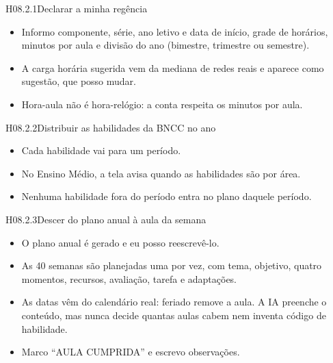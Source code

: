 \begin{historia}{H08.2.1}{Declarar a minha regência}{\pronto}
\aceite
\begin{itemize}
  \item Informo componente, série, ano letivo e data de início, grade de
    horários, minutos por aula e divisão do ano (bimestre, trimestre ou
    semestre).
  \item A carga horária sugerida vem da mediana de redes reais e aparece como
    sugestão, que posso mudar.
  \item Hora-aula não é hora-relógio: a conta respeita os minutos por aula.
\end{itemize}
\end{historia}

\begin{historia}{H08.2.2}{Distribuir as habilidades da BNCC no ano}{\pronto}
\aceite
\begin{itemize}
  \item Cada habilidade vai para um período.
  \item No Ensino Médio, a tela avisa quando as habilidades são por área.
  \item Nenhuma habilidade fora do período entra no plano daquele período.
\end{itemize}
\end{historia}

\begin{historia}{H08.2.3}{Descer do plano anual à aula da semana}{\pronto}
\aceite
\begin{itemize}
  \item O plano anual é gerado e eu posso reescrevê-lo.
  \item As 40 semanas são planejadas uma por vez, com tema, objetivo, quatro
    momentos, recursos, avaliação, tarefa e adaptações.
  \item As datas vêm do calendário real: feriado remove a aula. A IA preenche
    o conteúdo, mas nunca decide quantas aulas cabem nem inventa código de
    habilidade.
  \item Marco \enquote{AULA CUMPRIDA} e escrevo observações.
\end{itemize}
\end{historia}

